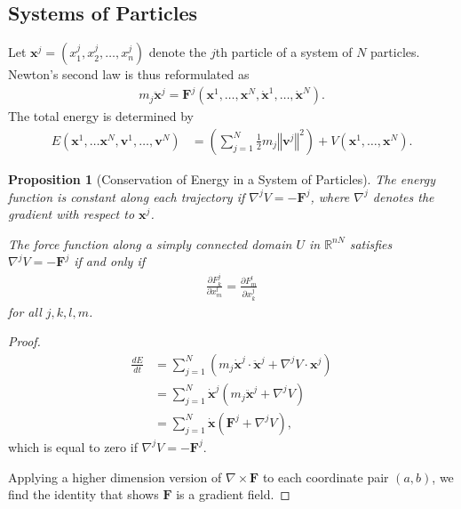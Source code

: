 \documentclass[12pt]{extarticle}
\newcommand{\R}{\mathbb{R}}
\newcommand{\norm}[1]{\left\Vert #1\right\Vert}
\theoremstyle{plain}
\newtheorem*{proposition}{Proposition}%
\theoremstyle{definition}
\theoremstyle{remark}
\renewcommand{\newline}{\hfill\break}
\begin{document}
  \subsection{Systems of Particles}%
  Let $\mathbf{x}^j = \left(x_{1}^j,x_2^j,\dots,x_n^j\right)$ denote the $j$th particle of a system of $N$ particles. Newton's second law is thus reformulated as
  \begin{align*}
    m_j\mathbf{\ddot{x}}^j = \mathbf{F}^j\left(\mathbf{x}^1,\dots,\mathbf{x}^N,\mathbf{\dot{x}}^1,\dots,\mathbf{\dot{x}}^N\right).
  \end{align*}
  The total energy is determined by
  \begin{align*}
    E(\mathbf{x}^1,\dots\mathbf{x}^N,\mathbf{v}^1,\dots,\mathbf{v}^N) &= \left(\sum_{j=1}^{N}\frac{1}{2}m_j\norm{\mathbf{v}^j}^2\right) + V(\mathbf{x}^1,\dots,\mathbf{x}^N).
  \end{align*}
  \begin{proposition}[Conservation of Energy in a System of Particles]
    
  The energy function is constant along each trajectory if $\nabla^{j}V = -\mathbf{F}^j$, where $\nabla^j$ denotes the gradient with respect to $\mathbf{x}^j$.\newline

  The force function along a simply connected domain $U$ in $\R^{nN}$ satisfies $\nabla^j V = -\mathbf{F}^j$ if and only if
  \begin{align*}
    \frac{\partial F_{k}^j}{\partial x_m^l} = \frac{\partial F_m^l}{\partial x_k^j}
  \end{align*}
  for all $j,k,l,m$.
  \end{proposition}
  \begin{proof}
      \begin{align*}
        \frac{dE}{dt} &= \sum_{j=1}^{N}\left(m_j\mathbf{\dot{x}}^j\cdot\mathbf{\ddot{x}}^j + \nabla^{j}V\cdot \mathbf{x}^j\right)\\
                      &= \sum_{j=1}^{N}\mathbf{\dot{x}}^j\left(m_j\mathbf{\ddot{x}}^j + \nabla^jV\right)\\
                      &= \sum_{j=1}^{N}\mathbf{\dot{x}}\left(\mathbf{F}^j + \nabla^j V\right),
      \end{align*}
      which is equal to zero if $\nabla^j V = -\mathbf{F}^j$.\newline

      Applying a higher dimension version of $\nabla \times \mathbf{F}$ to each coordinate pair $(a,b)$, we find the identity that shows $\mathbf{F}$ is a gradient field.
  \end{proof}
\end{document}
